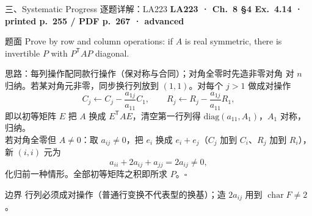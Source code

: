 \documentclass[aspectratio=169,10pt,fontset=none]{ctexbeamer}
\newcommand{\ex}[1]{\textcolor{accent}{\footnotesize\bfseries #1}}
\begin{document}
\begin{frame}[t]{三、Systematic Progress 逐题详解：LA223}
  \leavevmode\ex{LA223 · Ch.~8 §4 Ex.~4.14 · printed p.~255 / PDF p.~267 · advanced}
  \begin{block}{\footnotesize 题面}
    \scriptsize Prove by row and column operations: if $A$ is real symmetric, there is invertible $P$ with $P^{\mathsf T}AP$ diagonal.
  \end{block}
  \begin{exampleblock}{\footnotesize 思路：每列操作配同款行操作（保对称与合同）；对角全零时先造非零对角}
    \scriptsize
    对 $n$ 归纳。若某对角元非零，同步换行列放到 $(1,1)$。对每个 $j>1$ 做成对操作
    $$C_j\leftarrow C_j-\frac{a_{1j}}{a_{11}}C_1,\qquad R_j\leftarrow R_j-\frac{a_{1j}}{a_{11}}R_1,$$
    即以初等矩阵 $E$ 把 $A$ 换成 $E^{\mathsf T}AE$，清空第一行列得 $\mathrm{diag}(a_{11},A_1)$，$A_1$ 对称，归纳。\\
    若对角全零但 $A\ne0$：取 $a_{ij}\ne0$，把 $e_i$ 换成 $e_i+e_j$（$C_j$ 加到 $C_i$、$R_j$ 加到 $R_i$），新 $(i,i)$ 元为
    $$a_{ii}+2a_{ij}+a_{jj}=2a_{ij}\ne0,$$
    化归前一种情形。全部初等矩阵之积即所求 $P$。$\square$
  \end{exampleblock}
  \begin{block}{\footnotesize 边界}
    \scriptsize 行列必须成对操作（普通行变换不代表型的换基）；造 $2a_{ij}$ 用到 $\operatorname{char}F\ne2$。
  \end{block}
\end{frame}
\end{document}
